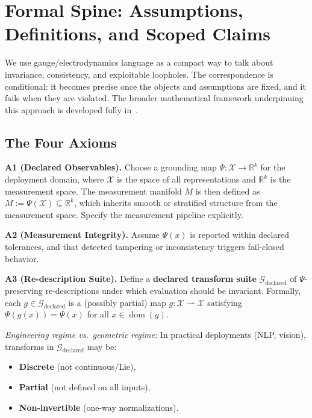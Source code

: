 \documentclass[12pt]{article}
\begin{document}
\section{Formal Spine: Assumptions, Definitions, and Scoped Claims}

We use gauge/electrodynamics language as a compact way to talk about invariance, consistency,
and exploitable loopholes. The correspondence is conditional: it becomes precise once the objects
and assumptions are fixed, and it fails when they are violated. The broader mathematical framework underpinning this approach is developed fully in~\cite{bond2026ge}.

\subsection{The Four Axioms}

\textbf{A1 (Declared Observables).} Choose a grounding map $\Psi : \mathcal{X} \to \mathbb{R}^k$ for the deployment domain,
where $\mathcal{X}$ is the space of all representations and $\mathbb{R}^k$ is the measurement space. The measurement
manifold $M$ is then defined as $M := \Psi(\mathcal{X}) \subseteq \mathbb{R}^k$, which inherits smooth or stratified structure from
the measurement space. Specify the measurement pipeline explicitly.

\textbf{A2 (Measurement Integrity).} Assume $\Psi(x)$ is reported within declared tolerances, and that
detected tampering or inconsistency triggers fail-closed behavior.

\textbf{A3 (Re-description Suite).} Define a \textbf{declared transform suite} $\mathcal{G}_{\text{declared}}$ of $\Psi$-preserving re-descriptions under which evaluation should be invariant. Formally, each $g \in \mathcal{G}_{\text{declared}}$ is a (possibly
partial) map $g : \mathcal{X} \rightharpoonup \mathcal{X}$ satisfying $\Psi(g(x)) = \Psi(x)$ for all $x \in \operatorname{dom}(g)$.

\emph{Engineering regime vs.\ geometric regime:} In practical deployments (NLP, vision), transforms
in $\mathcal{G}_{\text{declared}}$ may be:
\begin{itemize}
\item \textbf{Discrete} (not continuous/Lie),
\item \textbf{Partial} (not defined on all inputs),
\item \textbf{Non-invertible} (one-way normalizations).
\end{itemize}
\end{document}

